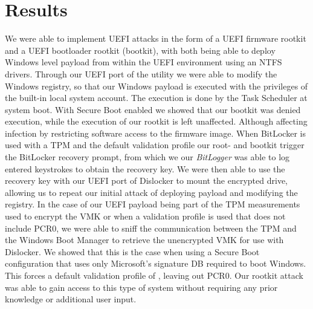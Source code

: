 
\chapter{Results}

We were able to implement \ac{UEFI} attacks in the form of a \ac{UEFI} firmware rootkit and a \ac{UEFI} bootloader rootkit (bootkit), with both being able to deploy Windows level payload from within the \ac{UEFI} environment using an \ac{NTFS} drivers.
Through our \ac{UEFI} port of the  utility we were able to modify the Windows registry, so that our Windows payload is executed with the privileges of the built-in local system account.
The execution is done by the Task Scheduler at system boot.
With Secure Boot enabled we showed that our bootkit was denied execution, while the execution of our rootkit is left unaffected. Although affecting infection by restricting software access to the firmware image.
When BitLocker is used with a \ac{TPM} and the default validation profile  our root- and bootkit trigger the BitLocker recovery prompt, from which we our \emph{BitLogger} was able to log entered keystrokes to obtain the recovery key. We were then able to use the recovery key with our \ac{UEFI} port of Dislocker to mount the encrypted drive, allowing us to repeat our initial attack of deploying payload and modifying the registry.
In the case of our \ac{UEFI} payload being part of the \ac{TPM} measurements used to encrypt the \ac{VMK} or when a validation profile is used that does not include \ac{PCR}0, we were able to sniff the communication between the \ac{TPM} and the Windows Boot Manager to retrieve the unencrypted \ac{VMK} for use with Dislocker.
We showed that this is the case when using a Secure Boot configuration that uses only Microsoft's signature \ac{DB} required to boot Windows. This forces a default validation profile of , leaving out \ac{PCR}0.
Our rootkit attack was able to gain access to this type of system without requiring any prior knowledge or additional user input.
